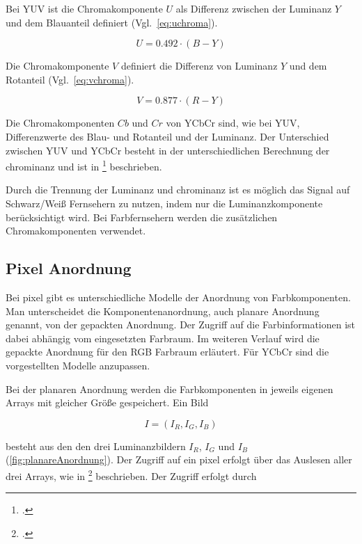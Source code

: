 Bei YUV ist die Chromakomponente $U$ als Differenz zwischen der Luminanz $Y$ und dem Blauanteil definiert (Vgl.~\autoref{eq:uchroma}).

\begin{equation}
	U = 0.492 \cdot \left(B-Y\right)
	\label{eq:uchroma}
\end{equation}

Die Chromakomponente $V$ definiert die Differenz von Luminanz $Y$ und dem Rotanteil (Vgl.~\autoref{eq:vchroma}).

\begin{equation}
	V = 0.877 \cdot \left(R-Y\right)
	\label{eq:vchroma}
\end{equation}

Die Chromakomponenten $Cb$ und $Cr$ von YCbCr sind, wie bei YUV, Differenzwerte des Blau- und Rotanteil und der Luminanz. Der Unterschied zwischen YUV und YCbCr besteht in der unterschiedlichen Berechnung der \gls{chrominanz} und ist in \citeauthor{burger05}\footcite[][S.265--266]{burger05} beschrieben.

Durch die Trennung der Luminanz und \gls{chrominanz} ist es möglich das Signal auf Schwarz/Weiß Fernsehern zu nutzen, indem nur die Luminanzkomponente berücksichtigt wird. Bei Farbfernsehern werden die zusätzlichen Chromakomponenten verwendet.


\subsection{Pixel Anordnung} %
\label{sub:pixelanordnung}
Bei \gls{pixel} gibt es unterschiedliche Modelle der Anordnung von Farbkomponenten. Man unterscheidet die Komponentenanordnung, auch planare Anordnung genannt, von der gepackten Anordnung. Der Zugriff auf die Farbinformationen ist dabei abhängig vom eingesetzten Farbraum. Im weiteren Verlauf wird die gepackte Anordnung für den RGB Farbraum erläutert. Für YCbCr sind die vorgestellten Modelle anzupassen.

Bei der planaren Anordnung werden die Farbkomponenten in jeweils eigenen Arrays mit gleicher Größe gespeichert. Ein Bild

\begin{equation}
	I = \left(I_R, I_G, I_B\right)
	\label{eq:planarImage}
\end{equation}

besteht aus den den drei Luminanzbildern $I_R$, $I_G$ und $I_B$ (\autoref{fig:planareAnordnung}). Der Zugriff auf ein \gls{pixel} erfolgt über das Auslesen aller drei Arrays, wie in \citeauthor{burger05}\footcite[Vgl.][S.~235--236]{burger05} beschrieben. Der Zugriff erfolgt durch

